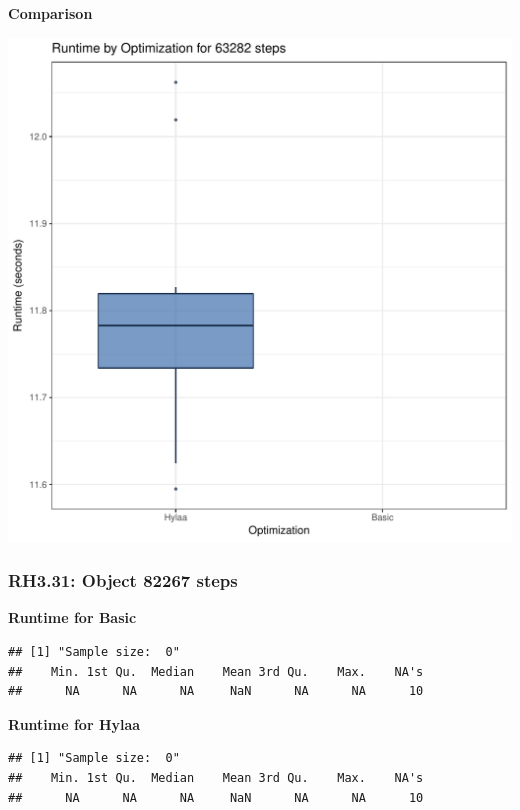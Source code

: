 \documentclass{article}\usepackage[]{graphicx}\usepackage[]{color}
\makeatletter
\def\maxwidth{ %
  \ifdim\Gin@nat@width>\linewidth
    \linewidth
  \else
    \Gin@nat@width
  \fi
}
\newenvironment{kframe}{%
 \def\at@end@of@kframe{}%
 \ifinner\ifhmode%
  \def\at@end@of@kframe{\end{minipage}}%
  \begin{minipage}{\columnwidth}%
 \fi\fi%
 \def\FrameCommand##1{\hskip\@totalleftmargin \hskip-\fboxsep
 \colorbox{shadecolor}{##1}\hskip-\fboxsep
     \hskip-\linewidth \hskip-\@totalleftmargin \hskip\columnwidth}%
 \MakeFramed {\advance\hsize-\width
   \@totalleftmargin\z@ \linewidth\hsize
   \@setminipage}}%
 {\par\unskip\endMakeFramed%
 \at@end@of@kframe}
\newenvironment{knitrout}{}{} %
\makeatother
\begin{document}
 \textbf{Comparison}
  
\begin{knitrout}
\color{fgcolor}
\includegraphics[width=\maxwidth]{figure/RH3_steps63282-1} 

\end{knitrout}


\subsubsection{RH3.31: Object 82267 steps}

 \textbf{Runtime for Basic}
\begin{knitrout}
\color{fgcolor}\begin{kframe}
\begin{verbatim}
## [1] "Sample size:  0"
##    Min. 1st Qu.  Median    Mean 3rd Qu.    Max.    NA's 
##      NA      NA      NA     NaN      NA      NA      10
\end{verbatim}
\end{kframe}
\end{knitrout}
 \textbf{Runtime for Hylaa}
\begin{knitrout}
\color{fgcolor}\begin{kframe}
\begin{verbatim}
## [1] "Sample size:  0"
##    Min. 1st Qu.  Median    Mean 3rd Qu.    Max.    NA's 
##      NA      NA      NA     NaN      NA      NA      10
\end{verbatim}
\end{kframe}
\end{knitrout}
  
\end{document}
